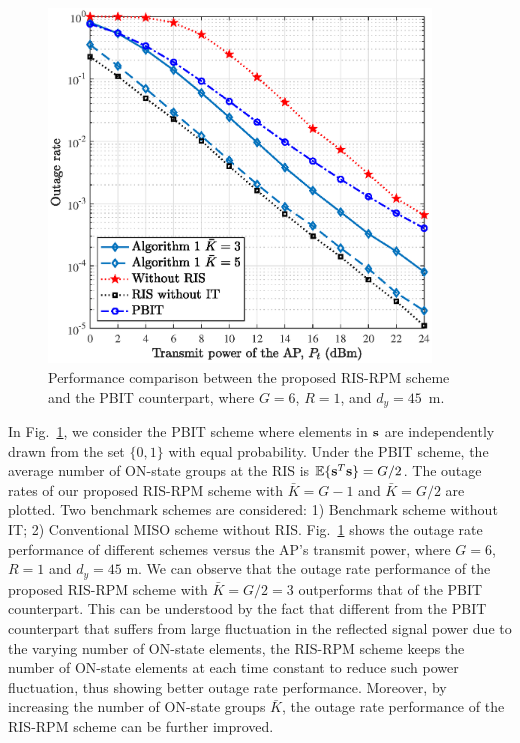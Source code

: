 \documentclass[draftclsnofoot,onecolumn,12pt]{IEEEtran}
\newcommand{\rev}[1]{{\color{red}#1}} %
\newcommand{\revh}[1]{{\color{black}#1}} %
\newcommand{\rev}[1]{#1}
\newcommand{\revh}[1]{#1}
\begin{document}
\begin{figure}[!t]
	\centering
	\includegraphics[width=4in]{MISO_G6_d45_pout_ce.eps}
	\revh{\caption{ Performance comparison between the proposed RIS-RPM scheme and the PBIT counterpart, where $G=6$, $R=1$, and $d_y=45$~m.}}
	\label{outage 1}
\end{figure}


In Fig.~\ref{outage 1}, we consider the PBIT scheme where elements in $\bf s$ are independently drawn from the set $\{0,1\}$ with equal probability. 
Under the PBIT scheme, the average number of ON-state groups at the RIS is $\mathbb{E}\{{\bf s}^T{\bf s}\}=G/2$. 
\revh{The outage rates of our proposed RIS-RPM scheme with ${\bar K}=G-1$ and ${\bar K}=G/2$ are plotted.} 
Two benchmark schemes are considered: 1) Benchmark scheme without IT; 2) Conventional MISO scheme without RIS. 
Fig.~\ref{outage 1} shows the outage rate performance of different schemes versus the AP’s transmit power, where $G=6$, $R=1$ and $d_y=45$ m.  
We can observe that the outage rate performance of the proposed RIS-RPM scheme with ${\bar K}=G/2=3$ outperforms that of the PBIT counterpart. This can be understood by the fact that different from the PBIT counterpart that suffers from large fluctuation in the reflected signal power due to the varying number of ON-state elements, the RIS-RPM scheme keeps the number of ON-state elements at each time constant to reduce such power fluctuation, thus showing better outage rate performance. 
\revh{Moreover, by increasing the number of ON-state groups ${\bar K}$, the outage rate performance of the RIS-RPM scheme can be further improved.} 
\end{document}
